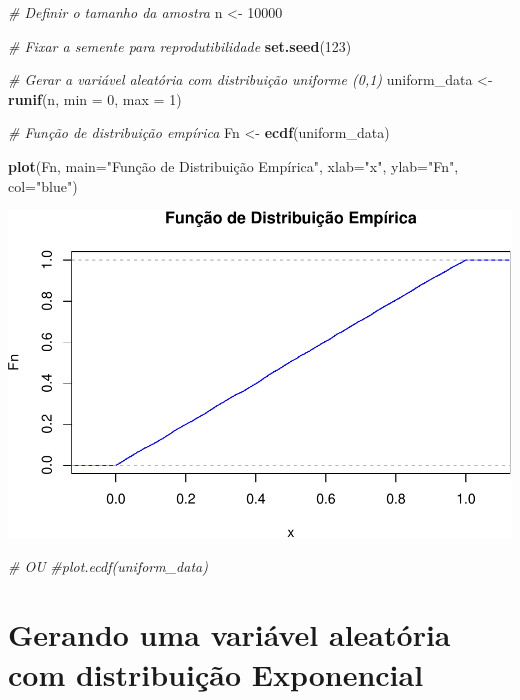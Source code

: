\documentclass[
]{book}
\newenvironment{Shaded}{\begin{snugshade}}{\end{snugshade}}
\newcommand{\AttributeTok}[1]{\textcolor[rgb]{0.13,0.29,0.53}{#1}}
\newcommand{\CommentTok}[1]{\textcolor[rgb]{0.56,0.35,0.01}{\textit{#1}}}
\newcommand{\DecValTok}[1]{\textcolor[rgb]{0.00,0.00,0.81}{#1}}
\newcommand{\FunctionTok}[1]{\textcolor[rgb]{0.13,0.29,0.53}{\textbf{#1}}}
\newcommand{\NormalTok}[1]{#1}
\newcommand{\OtherTok}[1]{\textcolor[rgb]{0.56,0.35,0.01}{#1}}
\newcommand{\StringTok}[1]{\textcolor[rgb]{0.31,0.60,0.02}{#1}}
\begin{document}
\begin{Shaded}
\begin{Highlighting}[]
\CommentTok{\# Definir o tamanho da amostra}
\NormalTok{n }\OtherTok{\textless{}{-}} \DecValTok{10000}

\CommentTok{\# Fixar a semente para reprodutibilidade}
\FunctionTok{set.seed}\NormalTok{(}\DecValTok{123}\NormalTok{)}

\CommentTok{\# Gerar a variável aleatória com distribuição uniforme (0,1)}
\NormalTok{uniform\_data }\OtherTok{\textless{}{-}} \FunctionTok{runif}\NormalTok{(n, }\AttributeTok{min =} \DecValTok{0}\NormalTok{, }\AttributeTok{max =} \DecValTok{1}\NormalTok{)}

\CommentTok{\# Função de distribuição empírica}
\NormalTok{Fn }\OtherTok{\textless{}{-}} \FunctionTok{ecdf}\NormalTok{(uniform\_data)}

\FunctionTok{plot}\NormalTok{(Fn, }\AttributeTok{main=}\StringTok{"Função de Distribuição Empírica"}\NormalTok{,}
     \AttributeTok{xlab=}\StringTok{"x"}\NormalTok{,}
     \AttributeTok{ylab=}\StringTok{"Fn"}\NormalTok{,}
     \AttributeTok{col=}\StringTok{"blue"}\NormalTok{)}
\end{Highlighting}
\end{Shaded}

\includegraphics{meuLivro2_files/figure-latex/unnamed-chunk-127-1.pdf}

\begin{Shaded}
\begin{Highlighting}[]
\CommentTok{\# OU}
\CommentTok{\#plot.ecdf(uniform\_data)}
\end{Highlighting}
\end{Shaded}

\section{Gerando uma variável aleatória com distribuição Exponencial}\label{gerando-uma-variuxe1vel-aleatuxf3ria-com-distribuiuxe7uxe3o-exponencial}
\end{document}
